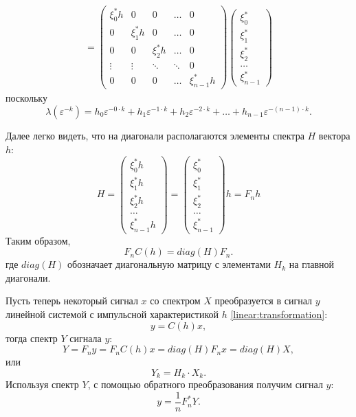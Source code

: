\begin{multline*}
    =
    \begin{pmatrix}
        \xi_0^* h & 0         & 0         & \dots  & 0             \\
        0         & \xi_1^* h & 0         & \dots  & 0             \\
        0         & 0         & \xi_2^* h & \dots  & 0             \\
        \vdots    & \vdots    & \ddots    & \ddots & 0             \\
        0         & 0         & 0         & \dots  & \xi_{n-1}^* h
    \end{pmatrix}
    \begin{pmatrix}
        \xi_0^* \\
        \xi_1^* \\
        \xi_2^* \\
        \dots   \\
        \xi_{n-1}^*
    \end{pmatrix}
\end{multline*}
поскольку
\[
    \lambda ( \varepsilon^{-k} )
    = h_0 \varepsilon^{- 0 \cdot k} + h_1 \varepsilon^{- 1 \cdot k} + h_2 \varepsilon^{- 2 \cdot k} + \dots + h_{n-1} \varepsilon^{- (n-1) \cdot k} .
\]

Далее легко видеть, что на диагонали располагаются элементы спектра $H$ вектора $h$:
\[
    H
    =
    \begin{pmatrix}
        \xi_0^* h \\
        \xi_1^* h \\
        \xi_2^* h \\
        \dots     \\
        \xi_{n-1}^* h
    \end{pmatrix}
    =
    \begin{pmatrix}
        \xi_0^* \\
        \xi_1^* \\
        \xi_2^* \\
        \dots   \\
        \xi_{n-1}^*
    \end{pmatrix}
    h
    = F_n h
\]
Таким образом,
\[
    F_n C(h) = diag \left( H \right) F_n.
\]
где $diag \left( H \right)$ обозначает диагональную матрицу с элементами $H_k$ на главной диагонали.

Пусть теперь некоторый сигнал $x$ со спектром $X$ преобразуется в сигнал $y$ линейной системой с импульсной характеристикой $h$ \eqref{linear:transformation}:
\[
    y = C(h) x ,
\]
тогда спектр $Y$ сигнала $y$:
\[
    Y
    = F_n y
    = F_n C(h) x
    = diag \left( H \right) F_n x
    = diag \left( H \right) X,
\]
или
\[
    Y_k = H_k \cdot X_k .
\]
Используя спектр $Y$, с помощью обратного преобразования получим сигнал $y$:
\[
    y = \frac{1}{n} F_n^* Y .
\]

